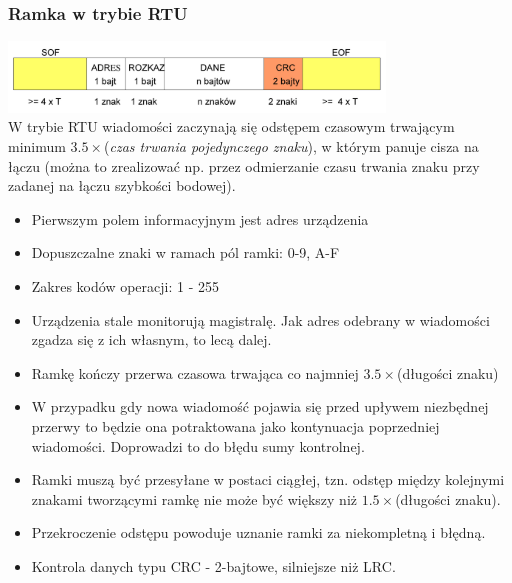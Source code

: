 		\subsubsection{Ramka w trybie RTU}
			\includegraphics[width=10cm]{./wyklady/RS232_18_2.pdf}\\
			W trybie RTU wiadomości zaczynają się odstępem czasowym trwającym minimum $3.5\times$(\emph{czas trwania pojedynczego znaku}), w którym panuje cisza na łączu (można to zrealizować np. przez odmierzanie czasu trwania znaku przy zadanej na łączu szybkości bodowej).
			\begin{itemize}
				\item Pierwszym polem informacyjnym jest adres urządzenia
				\item Dopuszczalne znaki w ramach pól ramki: 0-9, A-F
				\item Zakres kodów operacji: 1 - 255
				\item Urządzenia stale monitorują magistralę. Jak adres odebrany w wiadomości zgadza się z ich własnym, to lecą dalej.
				\item Ramkę kończy przerwa czasowa trwająca co najmniej $3.5\times$(długości znaku)
				\item W przypadku gdy nowa wiadomość pojawia się przed upływem niezbędnej przerwy to będzie ona potraktowana jako kontynuacja poprzedniej wiadomości. Doprowadzi to do błędu sumy kontrolnej.
				\item Ramki muszą być przesyłane w postaci ciągłej, tzn. odstęp między kolejnymi znakami tworzącymi ramkę nie może być większy niż $1.5\times$(długości znaku).
				\item Przekroczenie odstępu powoduje uznanie ramki za niekompletną i błędną.
				\item Kontrola danych typu CRC - 2-bajtowe, silniejsze niż LRC.
			\end{itemize}
